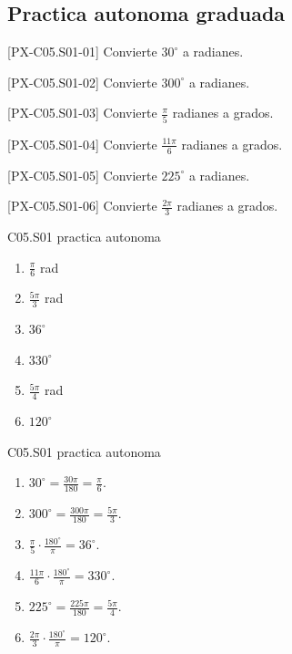 \subsection*{Practica autonoma graduada}
\begin{exercise}{[PX-C05.S01-01] Convierte \(30^\circ\) a radianes.}
\end{exercise}
\begin{exercise}{[PX-C05.S01-02] Convierte \(300^\circ\) a radianes.}
\end{exercise}
\begin{exercise}{[PX-C05.S01-03] Convierte \(\frac{\pi}{5}\) radianes a grados.}
\end{exercise}
\begin{exercise}{[PX-C05.S01-04] Convierte \(\frac{11\pi}{6}\) radianes a grados.}
\end{exercise}
\begin{exercise}{[PX-C05.S01-05] Convierte \(225^\circ\) a radianes.}
\end{exercise}
\begin{exercise}{[PX-C05.S01-06] Convierte \(\frac{2\pi}{3}\) radianes a grados.}
\end{exercise}

\begin{shortanswer}{C05.S01 practica autonoma}
\begin{enumerate}[label=\textbf{PX-C05.S01-\arabic*:}, leftmargin=*]
  \item \(\frac{\pi}{6}\) rad
  \item \(\frac{5\pi}{3}\) rad
  \item \(36^\circ\)
  \item \(330^\circ\)
  \item \(\frac{5\pi}{4}\) rad
  \item \(120^\circ\)
\end{enumerate}
\end{shortanswer}

\begin{fullsolution}{C05.S01 practica autonoma}
\begin{enumerate}[label=\textbf{PX-C05.S01-\arabic*:}, leftmargin=*]
  \item \(30^\circ=\frac{30\pi}{180}=\frac{\pi}{6}\).
  \item \(300^\circ=\frac{300\pi}{180}=\frac{5\pi}{3}\).
  \item \(\frac{\pi}{5}\cdot \frac{180^\circ}{\pi}=36^\circ\).
  \item \(\frac{11\pi}{6}\cdot \frac{180^\circ}{\pi}=330^\circ\).
  \item \(225^\circ=\frac{225\pi}{180}=\frac{5\pi}{4}\).
  \item \(\frac{2\pi}{3}\cdot \frac{180^\circ}{\pi}=120^\circ\).
\end{enumerate}
\end{fullsolution}

